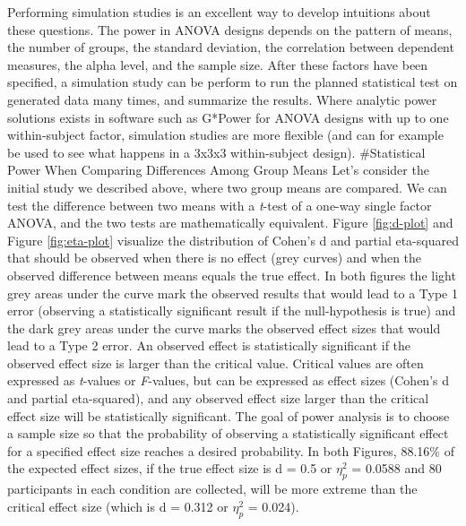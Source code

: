 \documentclass[,man,floatsintext]{apa6}
\begin{document}
Performing simulation studies is an excellent way to develop intuitions
about these questions. The power in ANOVA designs depends on the pattern
of means, the number of groups, the standard deviation, the correlation
between dependent measures, the alpha level, and the sample size. After
these factors have been specified, a simulation study can be perform to
run the planned statistical test on generated data many times, and
summarize the results. Where analytic power solutions exists in software
such as G*Power for ANOVA designs with up to one within-subject factor,
simulation studies are more flexible (and can for example be used to see
what happens in a 3x3x3 within-subject design). \#Statistical Power When
Comparing Differences Among Group Means Let's consider the initial study
we described above, where two group means are compared. We can test the
difference between two means with a \emph{t}-test of a one-way single
factor ANOVA, and the two tests are mathematically equivalent. Figure
\ref{fig:d-plot} and Figure \ref{fig:eta-plot} visualize the
distribution of Cohen's d and partial eta-squared that should be
observed when there is no effect (grey curves) and when the observed
difference between means equals the true effect. In both figures the
light grey areas under the curve mark the observed results that would
lead to a Type 1 error (observing a statistically significant result if
the null-hypothesis is true) and the dark grey areas under the curve
marks the observed effect sizes that would lead to a Type 2 error. An
observed effect is statistically significant if the observed effect size
is larger than the critical value. Critical values are often expressed
as \emph{t}-values or \emph{F}-values, but can be expressed as effect
sizes (Cohen's d and partial eta-squared), and any observed effect size
larger than the critical effect size will be statistically significant.
The goal of power analysis is to choose a sample size so that the
probability of observing a statistically significant effect for a
specified effect size reaches a desired probability. In both Figures,
88.16\% of the expected effect sizes, if the true effect size is d = 0.5
or \(\eta_p^2\) = 0.0588 and 80 participants in each condition are
collected, will be more extreme than the critical effect size (which is
d = 0.312 or \(\eta_p^2\) = 0.024).
\end{document}
